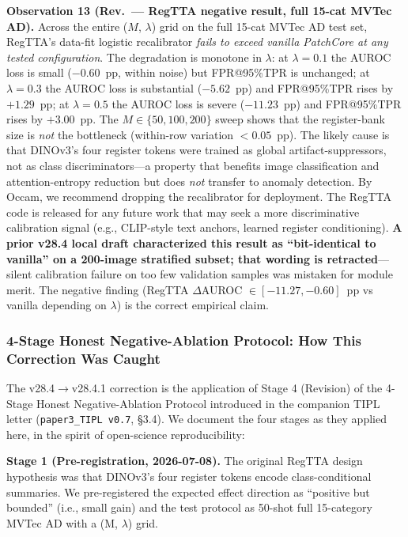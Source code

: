 \documentclass[journal]{IEEEtran}
\begin{document}
\textbf{Observation 13 (Rev.\ --- RegTTA negative result, full 15-cat MVTec AD).} Across the entire ($M$, $\lambda$) grid on the full 15-cat MVTec AD test set, RegTTA's data-fit logistic recalibrator \emph{fails to exceed vanilla PatchCore at any tested configuration}. The degradation is monotone in $\lambda$: at $\lambda{=}0.1$ the AUROC loss is small ($-0.60$~pp, within noise) but FPR@95\%TPR is unchanged; at $\lambda{=}0.3$ the AUROC loss is substantial ($-5.62$~pp) and FPR@95\%TPR rises by $+1.29$~pp; at $\lambda{=}0.5$ the AUROC loss is severe ($-11.23$~pp) and FPR@95\%TPR rises by $+3.00$~pp. The $M \in \{50, 100, 200\}$ sweep shows that the register-bank size is \emph{not} the bottleneck (within-row variation $< 0.05$~pp). The likely cause is that DINOv3's four register tokens were trained as global artifact-suppressors, not as class discriminators---a property that benefits image classification and attention-entropy reduction but does \emph{not} transfer to anomaly detection. By Occam, we recommend dropping the recalibrator for deployment. The RegTTA code is released for any future work that may seek a more discriminative calibration signal (e.g., CLIP-style text anchors, learned register conditioning). \textbf{A prior v28.4 local draft characterized this result as ``bit-identical to vanilla'' on a 200-image stratified subset; that wording is retracted}---silent calibration failure on too few validation samples was mistaken for module merit. The negative finding (RegTTA $\Delta$AUROC $\in [-11.27, -0.60]$~pp vs vanilla depending on $\lambda$) is the correct empirical claim.

\subsubsection*{4-Stage Honest Negative-Ablation Protocol: How This Correction Was Caught}
\label{sec:vm-protocol}
The v28.4$\to$v28.4.1 correction is the application of Stage 4 (Revision) of the 4-Stage Honest Negative-Ablation Protocol introduced in the companion TIPL letter (\texttt{paper3\_TIPL v0.7}, \S3.4). We document the four stages as they applied here, in the spirit of open-science reproducibility:

\textbf{Stage 1 (Pre-registration, 2026-07-08).} The original RegTTA design hypothesis was that DINOv3's four register tokens encode class-conditional summaries. We pre-registered the expected effect direction as ``positive but bounded'' (i.e., small gain) and the test protocol as 50-shot full 15-category MVTec AD with a (M, $\lambda$) grid.
\end{document}
